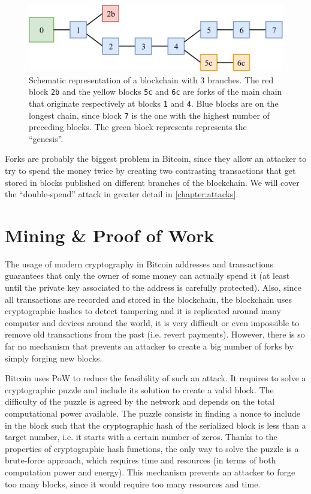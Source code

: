 \begin{figure}[h]
	\centering
	\vspace*{0.25cm}
	\includegraphics[scale=0.8]{figures/forks}
	\vspace*{0.25cm}
	\caption{
		Schematic representation of a blockchain with \num{3} branches.
		The red block \texttt{2b} and the yellow blocks \texttt{5c} and \texttt{6c} are forks of the main chain that originate respectively at blocks \texttt{1} and \texttt{4}.
		Blue blocks are on the longest chain, since block \texttt{7} is the one with the highest number of preceding blocks.
		The green block represents represents the ``genesis''.
	}
	\label{fig:forks}
\end{figure}

Forks are probably the biggest problem in Bitcoin, since they allow an attacker to try to spend the money twice by creating two contrasting transactions that get stored in blocks published on different branches of the blockchain.
We will cover the ``double-spend'' attack in greater detail in \cref{chapter:attacks}.

\section{Mining \& Proof of Work}
\label{sec:mining}
The usage of modern cryptography in Bitcoin addresses and transactions guarantees that only the owner of some money can actually spend it (at least until the private key associated to the address is carefully protected).
Also, since all transactions are recorded and stored in the blockchain, the blockchain uses cryptographic hashes to detect tampering and it is replicated around many computer and devices around the world, it is very difficult or even impossible to remove old transactions from the past (i.e. revert payments).
However, there is so far no mechanism that prevents an attacker to create a big number of forks by simply forging new blocks.

\bigskip
Bitcoin uses \ac{PoW} \cite{pow_2002} to reduce the feasibility of such an attack.
It requires to solve a cryptographic puzzle and include its solution to create a valid block.
The difficulty of the puzzle is agreed by the network and depends on the total computational power available.
The puzzle consists in finding a nonce to include in the block such that the cryptographic hash of the serialized block is less than a target number, i.e. it starts with a certain number of zeros.
Thanks to the properties of cryptographic hash functions, the only way to solve the puzzle is a brute-force approach, which requires time and resources (in terms of both computation power and energy).
This mechanism prevents an attacker to forge too many blocks, since it would require too many resources and time.

